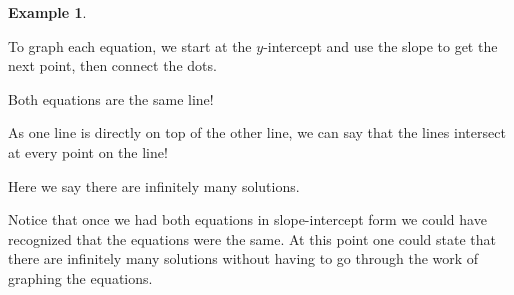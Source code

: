 \documentclass[12pt]{book}
\theoremstyle{definition}
\newtheorem{example}{Example}
\begin{document}
\begin{example}
\begin{multicols}{2}
	
	\columnbreak
	
    To graph each equation, we start at the $y$-intercept and use the slope to get the next point, then connect the dots.\par
    Both equations are the same line!\par
    As one line is directly on top of the other line, we can say that the lines intersect at every point on the line!\par
    Here we say there are infinitely many solutions.
\end{multicols}
\end{example}
Notice that once we had both equations in slope-intercept form we could have recognized that the equations were the same. At this point one could state that there are infinitely many solutions without having to go through the work of graphing the equations.
\end{document}
